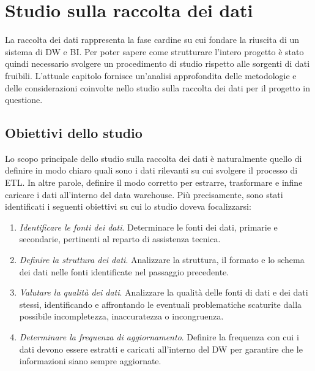 \section{Studio sulla raccolta dei dati}

La raccolta dei dati rappresenta la fase cardine su cui fondare la riuscita di un sistema di DW e BI. Per poter sapere come strutturare l'intero progetto è stato quindi necessario svolgere un procedimento di studio rispetto alle sorgenti di dati fruibili. L'attuale capitolo fornisce un'analisi approfondita delle metodologie e delle considerazioni coinvolte nello studio sulla raccolta dei dati per il progetto in questione.

\subsection{Obiettivi dello studio}

Lo scopo principale dello studio sulla raccolta dei dati è naturalmente quello di definire in modo chiaro quali sono i dati rilevanti su cui svolgere il processo di ETL. In altre parole, definire il modo corretto per estrarre, trasformare e infine caricare i dati all'interno del data warehouse. Più precisamente, sono stati identificati i seguenti obiettivi su cui lo studio doveva focalizzarsi:

\begin{enumerate}
    \item \textit{Identificare le fonti dei dati}. Determinare le fonti dei dati, primarie e secondarie, pertinenti al reparto di assistenza tecnica.
    \item \textit{Definire la struttura dei dati}. Analizzare la struttura, il formato e lo schema dei dati nelle fonti identificate nel passaggio precedente.
    \item \textit{Valutare la qualità dei dati}. Analizzare la qualità delle fonti di dati e dei dati stessi, identificando e affrontando le eventuali problematiche scaturite dalla possibile incompletezza, inaccuratezza o incongruenza.
    \item \textit{Determinare la frequenza di aggiornamento}. Definire la frequenza con cui i dati devono essere estratti e caricati all'interno del DW per garantire che le informazioni siano sempre aggiornate.
\end{enumerate}

